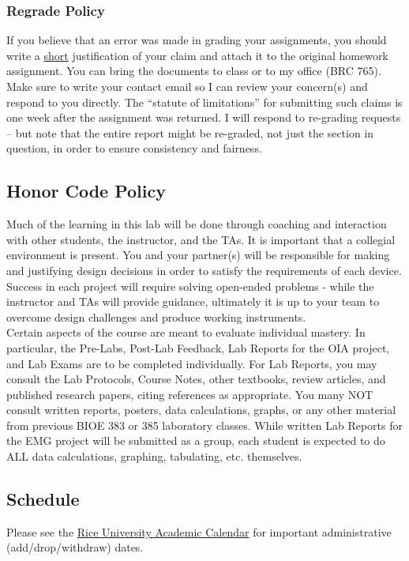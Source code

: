 \documentclass{article}
\begin{document}
\subsubsection*{Regrade Policy}
If you believe that an error was made in grading your assignments, you should write a \underline{short} justification of your claim and attach it to the original homework assignment. You can bring the documents to class or to my office (BRC 765).  Make sure to write your contact email so I can review your concern(s) and respond to you directly. The “statute of limitations” for submitting such claims is one week after the assignment was returned.  I will respond to re-grading requests – but note that the entire report might be re-graded, not just the section in question, in order to ensure consistency and fairness. 

\subsection*{Honor Code Policy}

Much of the learning in this lab will be done through coaching and interaction with other students, the instructor, and the TAs. It is important that a collegial environment is present. You and your partner(s) will be responsible for making and justifying design decisions in order to satisfy the requirements of each device. Success in each project will require solving open-ended problems - while the instructor and TAs will provide guidance, ultimately it is up to your team to overcome design challenges and produce working instruments.\\

Certain aspects of the course are meant to evaluate individual mastery. In particular, the Pre-Labs, Post-Lab Feedback, Lab Reports for the OIA project, and Lab Exams are to be completed individually. For Lab Reports, you may consult the Lab Protocols, Course Notes, other textbooks, review articles, and published research papers, citing references as appropriate. You many NOT consult written reports, posters, data calculations, graphs, or any other material from previous BIOE 383 or 385 laboratory classes. While written Lab Reports for the EMG project will be submitted as a group, each student is expected to do ALL data calculations, graphing, tabulating, etc. themselves.

\subsection*{Schedule}
Please see the \href{https://registrar.rice.edu/calendars/fall-semester-2022}{Rice University Academic Calendar} for important administrative (add/drop/withdraw) dates.\\
\end{document}
